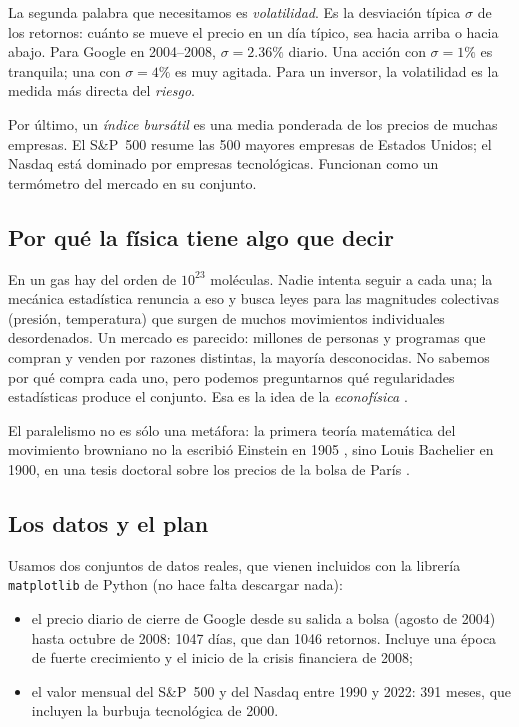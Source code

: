 \documentclass[11pt,a4paper]{article}
\begin{document}
La segunda palabra que necesitamos es \emph{volatilidad}. Es la desviación típica $\sigma$ de los
retornos: cuánto se mueve el precio en un día típico, sea hacia arriba o hacia abajo. Para Google en
2004--2008, $\sigma=2.36\%$ diario. Una acción con $\sigma=1\%$ es tranquila; una con $\sigma=4\%$ es muy
agitada. Para un inversor, la volatilidad es la medida más directa del \emph{riesgo}.

Por último, un \emph{índice bursátil} es una media ponderada de los precios de muchas empresas. El
S\&P~500 resume las 500 mayores empresas de Estados Unidos; el Nasdaq está dominado por empresas
tecnológicas. Funcionan como un termómetro del mercado en su conjunto.

\subsection{Por qué la física tiene algo que decir}

En un gas hay del orden de $10^{23}$ moléculas. Nadie intenta seguir a cada una; la mecánica estadística
renuncia a eso y busca leyes para las magnitudes colectivas (presión, temperatura) que surgen de muchos
movimientos individuales desordenados. Un mercado es parecido: millones de personas y programas que
compran y venden por razones distintas, la mayoría desconocidas. No sabemos por qué compra cada uno, pero
podemos preguntarnos qué regularidades estadísticas produce el conjunto. Esa es la idea de la
\emph{econofísica} \cite{mantegna2000,bouchaud2003}.

El paralelismo no es sólo una metáfora: la primera teoría matemática del movimiento browniano no la
escribió Einstein en 1905 \cite{einstein1905}, sino Louis Bachelier en 1900, en una tesis doctoral sobre
los precios de la bolsa de París \cite{bachelier1900}.

\subsection{Los datos y el plan}

Usamos dos conjuntos de datos reales, que vienen incluidos con la librería \texttt{matplotlib} de Python
(no hace falta descargar nada):
\begin{itemize}
\item el precio diario de cierre de Google desde su salida a bolsa (agosto de 2004) hasta octubre de
2008: 1047 días, que dan 1046 retornos. Incluye una época de fuerte crecimiento y el inicio de la crisis
financiera de 2008;
\item el valor mensual del S\&P~500 y del Nasdaq entre 1990 y 2022: 391 meses, que incluyen la burbuja
tecnológica de 2000.
\end{itemize}
\end{document}
